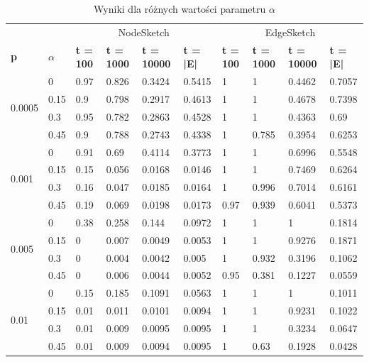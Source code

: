     \begin{table}[!ht]
        \small
        \centering
        \begin{tabular}{|l|l|l|l|l|l|l|l|l|l|}
        \hline
            & & \multicolumn{4}{c|}{NodeSketch} & \multicolumn{4}{c|}{EdgeSketch} \\ \cline{1-10}
            \textbf{p} & \textbf{$\alpha$} & \textbf{t = 100} & \textbf{t = 1000} & \textbf{t = 10000} & \textbf{t = |E|} & \textbf{t = 100} & \textbf{t = 1000} & \textbf{t = 10000} & \textbf{t = |E|} \\ \hline\hline
        \multirow{4}{*}{0.0005} & 0 & 0.97 & 0.826 & 0.3424 & 0.5415 & 1 & 1 & 0.4462 & 0.7057 \\ \cline{2-10}
            & 0.15 & 0.9 & 0.798 & 0.2917 & 0.4613 & 1 & 1 & 0.4678 & 0.7398 \\ \cline{2-10}
            & 0.3 & 0.95 & 0.782 & 0.2863 & 0.4528 & 1 & 1 & 0.4363 & 0.69 \\ \cline{2-10}
            & 0.45 & 0.9 & 0.788 & 0.2743 & 0.4338 & 1 & 0.785 & 0.3954 & 0.6253 \\ \hline\hline
        \multirow{4}{*}{0.001}    & 0 & 0.91 & 0.69 & 0.4114 & 0.3773 & 1 & 1 & 0.6996 & 0.5548 \\ \cline{2-10}
            & 0.15 & 0.15 & 0.056 & 0.0168 & 0.0146 & 1 & 1 & 0.7469 & 0.6264\\ \cline{2-10}
            & 0.3 & 0.16 & 0.047 & 0.0185 & 0.0164 & 1 & 0.996 & 0.7014 & 0.6161 \\ \cline{2-10}
            & 0.45 & 0.19 & 0.069 & 0.0198 & 0.0173 & 0.97 & 0.939 & 0.6041 & 0.5373 \\ \hline\hline
        \multirow{4}{*}{0.005}    & 0 & 0.38 & 0.258 & 0.144 & 0.0972 & 1 & 1 & 1 & 0.1814 \\ \cline{2-10}
            & 0.15 & 0 & 0.007 & 0.0049 & 0.0053 & 1 & 1 & 0.9276 & 0.1871 \\ \cline{2-10}
            & 0.3 & 0 & 0.004 & 0.0042 & 0.005 & 1 & 0.932 & 0.3196 & 0.1062 \\ \cline{2-10}
            & 0.45 & 0 & 0.006 & 0.0044 & 0.0052 & 0.95 & 0.381 & 0.1227 & 0.0559 \\ \hline\hline
        \multirow{4}{*}{0.01}    & 0 & 0.15 & 0.185 & 0.1091 & 0.0563 & 1 & 1 & 1 & 0.1011 \\ \cline{2-10}
            & 0.15 & 0.01 & 0.011 & 0.0101 & 0.0094 & 1 & 1 & 0.9231 & 0.1022 \\ \cline{2-10}
            & 0.3 & 0.01 & 0.009 & 0.0095 & 0.0095 & 1 & 1 & 0.3234 & 0.0647 \\ \cline{2-10}
            & 0.45 & 0.01 & 0.009 & 0.0094 & 0.0095 & 1 & 0.63 & 0.1928 & 0.0428 \\ \hline
        \end{tabular}
        \caption{Wyniki dla różnych wartości parametru $\alpha$}
        \label{tab:alpha}
    \end{table}

